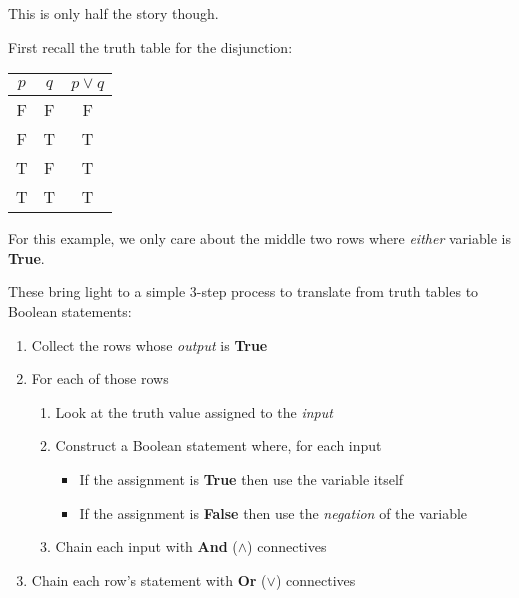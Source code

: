 \documentclass[main.tex]{subfiles}
\begin{document}
This is only half the story though.

\begin{example}
	First recall the truth table for the disjunction:
	
	\begin{center}
		\begin{tabular}{cc|c}
			\(p\) & \(q\) & \(p \lor q\) \\
			\hline
			F & F & F \\
			F & T & T \\
			T & F & T \\
			T & T & T
		\end{tabular}
	\end{center}
	
	For this example, we only care about the middle two rows where \textit{either} variable is \textbf{True}.
	
	
\end{example}

These bring light to a simple 3-step process to translate from truth tables to Boolean statements:

\begin{enumerate}
	\item Collect the rows whose \textit{output} is \textbf{True}
	\item For each of those rows
	\begin{enumerate}
		\item Look at the truth value assigned to the \textit{input}
		\item Construct a Boolean statement where, for each input
		\begin{itemize}
			\item If the assignment is \textbf{True} then use the variable itself
			\item If the assignment is \textbf{False} then use the \textit{negation} of the variable
		\end{itemize}
		\item Chain each input with \textbf{And} (\(\land\)) connectives
	\end{enumerate}
	\item Chain each row's statement with \textbf{Or} (\(\lor\)) connectives
\end{enumerate}
\end{document}
